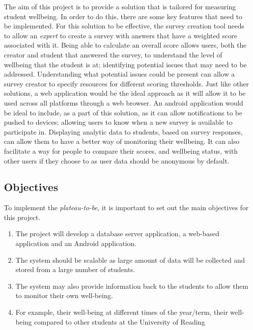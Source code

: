 The aim of this project is to provide a solution that is tailored for measuring student wellbeing. 
In order to do this, there are some key features that need to be implemented.
For this solution to be effective, the survey creation tool needs to allow an \textit{expert} to create a survey with answers that have 
a weighted score associated with it. 
Being able to calculate an overall score allows users, both the creator and student that answered the survey, to understand the level of 
wellbeing that the student is at; identifying potential issues that may need to be addressed.
Understanding what potential issues could be present can allow a survey creator to specify resources for different scoring thresholds.
Just like other solutions, a web application would be the ideal approach as it will allow it to be used across all platforms through a web
browser.
An android application would be ideal to include, as a part of this solution, as it can allow notifications to be pushed to devices; allowing
users to know when a new survey is available to participate in.
Displaying analytic data to students, based on survey responses, can allow them to have a better way of monitoring their wellbeing.
It can also facilitate a way for people to compare their scores, and wellbeing status, with other users if they choose to as user data should be
anonymous by default.

\subsection{Objectives}
To implement the \textit{plateau-to-be}, it is important to set out the main objectives for this project.

\begin{enumerate}
    \item The project will develop a database server application, a web-based application and an Android application.
    \item The system should be scalable as large amount of data will be collected and stored from a large number of students. 
    \item The system may also provide information back to the students to allow them to monitor their own well-being.
    \item For example, their well-being at different times of the year/term, their well-being compared to other students at the University of Reading
\end{enumerate}


